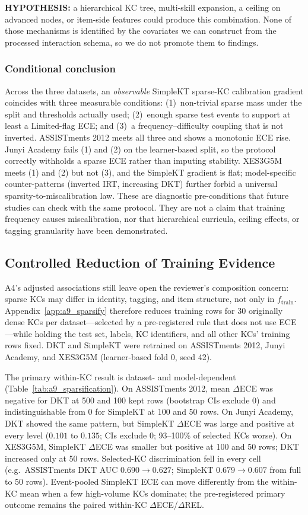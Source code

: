 \textbf{HYPOTHESIS:} a hierarchical KC tree, multi-skill expansion, a ceiling on advanced nodes, or item-side features could produce this combination.
None of those mechanisms is identified by the covariates we can construct from the processed interaction schema, so we do not promote them to findings.

\subsubsection*{Conditional conclusion}
Across the three datasets, an \emph{observable} SimpleKT sparse-KC calibration gradient coincides with three measurable conditions: (1)~non-trivial sparse mass under the split and thresholds actually used; (2)~enough sparse test events to support at least a Limited-flag ECE; and (3)~a frequency--difficulty coupling that is not inverted.
ASSISTments 2012 meets all three and shows a monotonic ECE rise.
Junyi Academy fails (1) and (2) on the learner-based split, so the protocol correctly withholds a sparse ECE rather than imputing stability.
XES3G5M meets (1) and (2) but not (3), and the SimpleKT gradient is flat; model-specific counter-patterns (inverted IRT, increasing DKT) further forbid a universal sparsity-to-miscalibration law.
These are diagnostic pre-conditions that future studies can check with the same protocol.
They are not a claim that training frequency causes miscalibration, nor that hierarchical curricula, ceiling effects, or tagging granularity have been demonstrated.

\subsection{Controlled Reduction of Training Evidence}
\label{sec:a9_sparsify}
A4's adjusted associations still leave open the reviewer's composition concern: sparse KCs may differ in identity, tagging, and item structure, not only in $f_{\mathrm{train}}$.
Appendix~\ref{app:a9_sparsify} therefore reduces training rows for 30 originally dense KCs per dataset---selected by a pre-registered rule that does not use ECE---while holding the test set, labels, KC identifiers, and all other KCs' training rows fixed. DKT and SimpleKT were retrained on ASSISTments 2012, Junyi Academy, and XES3G5M (learner-based fold 0, seed 42).

The primary within-KC result is dataset- and model-dependent (Table~\ref{tab:a9_sparsification}). On ASSISTments 2012, mean $\Delta$ECE was negative for DKT at 500 and 100 kept rows (bootstrap CIs exclude 0) and indistinguishable from 0 for SimpleKT at 100 and 50 rows. On Junyi Academy, DKT showed the same pattern, but SimpleKT $\Delta$ECE was large and positive at every level ($0.101$ to $0.135$; CIs exclude 0; 93--100\% of selected KCs worse). On XES3G5M, SimpleKT $\Delta$ECE was smaller but positive at 100 and 50 rows; DKT increased only at 50 rows. Selected-KC discrimination fell in every cell (e.g.\ ASSISTments DKT AUC $0.690\to 0.627$; SimpleKT $0.679\to 0.607$ from full to 50 rows). Event-pooled SimpleKT ECE can move differently from the within-KC mean when a few high-volume KCs dominate; the pre-registered primary outcome remains the paired within-KC $\Delta$ECE/$\Delta$REL.

